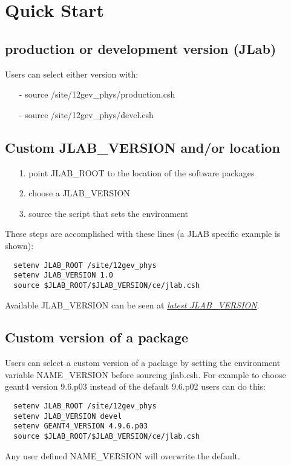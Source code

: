 \section{Quick Start}

\subsection{production or development version (JLab)}
Users can select either version with:
\begin{itemize}
\item[-] source /site/12gev\_phys/production.csh
\item[-] source /site/12gev\_phys/devel.csh
\end{itemize}
\subsection{Custom JLAB\_VERSION and/or location}

\begin{itemize}
\item[1.] point JLAB\_ROOT to the location of the software packages
\item[2.] choose a JLAB\_VERSION
\item[3.] source the script that sets the environment
\end{itemize}
These steps are accomplished with these lines 
(a JLAB specific example is shown):

\begin{verbatim}
  setenv JLAB_ROOT /site/12gev_phys
  setenv JLAB_VERSION 1.0
  source $JLAB_ROOT/$JLAB_VERSION/ce/jlab.csh
\end{verbatim}
Available JLAB\_VERSION can be seen at 
\href{https://gemc.jlab.org/gemc/Documentation/Entries/2014/2/27_jlab_versions.html}{\it latest JLAB\_VERSION}.

\subsection{Custom version of a package}
Users can select a custom version of a package by setting the 
environment variable NAME\_VERSION before sourcing jlab.csh.
For example to choose geant4 version 9.6.p03 instead of the default 9.6.p02 users can do this:
\begin{verbatim}
  setenv JLAB_ROOT /site/12gev_phys
  setenv JLAB_VERSION devel
  setenv GEANT4_VERSION 4.9.6.p03
  source $JLAB_ROOT/$JLAB_VERSION/ce/jlab.csh
\end{verbatim}
Any user defined NAME\_VERSION will overwrite the default. 

